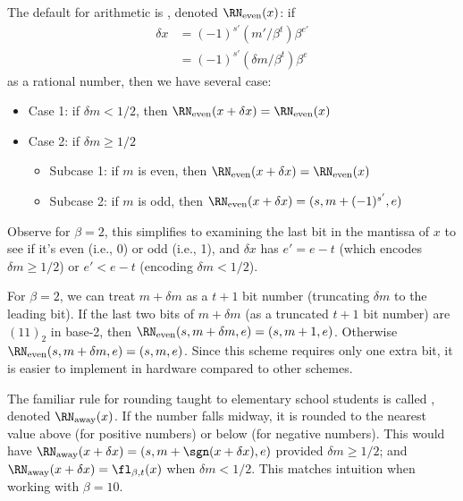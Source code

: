 \begin{defn}
  The default for  arithmetic is
  ,
  denoted $\RN_{\text{even}}(x)$:
  if
  \begin{equation}
    \begin{split}
      \delta x &= (-1)^{s'}(m'/\beta^{t})\beta^{e'}\\
      &= (-1)^{s'}(\delta m/\beta^{t})\beta^{e}
    \end{split}
  \end{equation}
  as a rational number, then we have several case:
  \begin{itemize}
    \item Case 1: if $\delta m<1/2$, then $\RN_{\text{even}}(x+\delta x)=\RN_{\text{even}}(x)$
    \item Case 2: if $\delta m\geq1/2$
      \begin{itemize}
        \item Subcase 1: if $m$ is even, then $\RN_{\text{even}}(x+\delta x)=\RN_{\text{even}}(x)$
        \item Subcase 2: if $m$ is odd, then $\RN_{\text{even}}(x+\delta x)=(s,m+(-1)^{s'},e)$
      \end{itemize}
  \end{itemize}
  Observe for $\beta=2$, this simplifies to examining the last bit in
  the mantissa of $x$ to see if it's even (i.e., 0) or odd (i.e., 1),
  and $\delta x$ has $e'=e-t$ (which encodes $\delta m\geq1/2$) or
  $e'<e-t$ (encoding $\delta m<1/2$).
\end{defn}

\begin{rmk}
  For $\beta=2$, we can treat $m+\delta m$ as a $t+1$ bit number
  (truncating $\delta m$ to the leading bit). If the last two bits of
  $m+\delta m$ (as a truncated $t+1$ bit number) are
  $(11)_{2}$ in base-2, then $\RN_{\text{even}}(s,m+\delta m,e)=(s,m+1,e)$.
  Otherwise $\RN_{\text{even}}(s,m+\delta m,e)=(s,m,e)$. Since this
  scheme requires only one extra bit, it is easier to implement in
  hardware compared to other schemes.
\end{rmk}
\begin{defn}
  The familiar rule for rounding taught to elementary school students is
  called , denoted $\RN_{\text{away}}(x)$. If the number falls
  midway, it is rounded to the nearest value above (for positive
  numbers) or below (for negative numbers). This would have
  $\RN_{\text{away}}(x+\delta x)=(s,m+\sgn(x+\delta x), e)$ provided $\delta m\geq1/2$;
  and $\RN_{\text{away}}(x+\delta x)=\fl_{\beta,t}(x)$ when $\delta m<1/2$.
  This matches intuition when working with $\beta=10$.
\end{defn}

